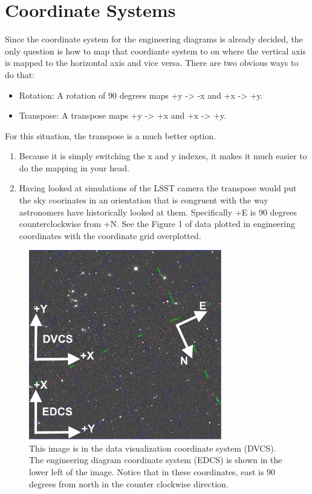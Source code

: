 \section{Coordinate Systems}
Since the coordinate system for the engineering diagrams is already decided, the only question is how to map that coordiante system to on where the vertical axis is mapped to the horizontal axis and vice versa. There are two obvious ways to do that:

\begin{itemize}
\item Rotation: A rotation of 90 degrees maps +y -> -x and +x -> +y.
\item Transpose: A transpose maps +y -> +x and +x -> +y.
\end{itemize}

For this situation, the transpose is a much better option.

\begin{enumerate}
\item Because it is simply switching the x and y indexes, it makes it much easier to do the mapping in your head.
\item Having looked at simulations of the LSST camera the transpose would put the sky coorinates in an orientation that is congruent with the way astronomers have historically looked at them. Specifically +E is 90 degrees counterclockwise from +N. See the Figure 1 of data plotted in engineering coordinates with the coordinate grid overplotted.
\end{enumerate}

\begin{figure}[h]
\centering
\includegraphics[width=0.75\textwidth]{figures/ds9_coords_with_arrows.png}
\caption{This image is in the data visualization coordinate system (DVCS).  The engineering diagram coordinate system (EDCS) is shown in the lower left of the image.  Notice that in these coordinates, east is 90 degrees from north in the counter clockwise direction.}
\end{figure}
